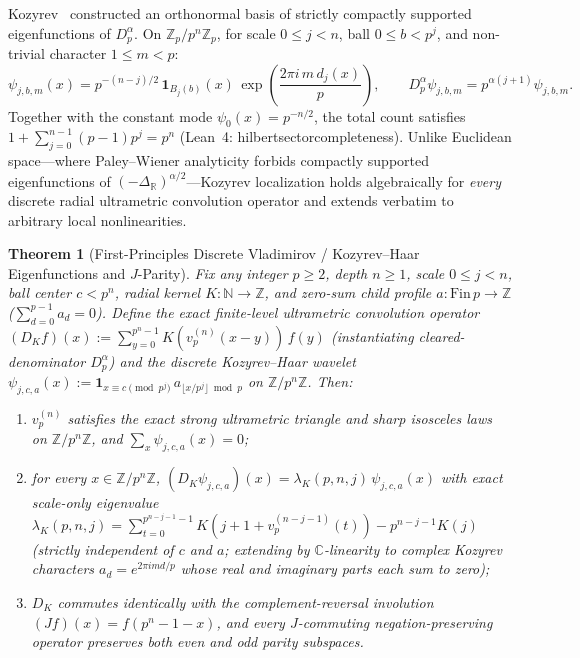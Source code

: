 \documentclass[11pt,a4paper]{article}
\numberwithin{equation}{section}
\theoremstyle{plain}
\newtheorem{theorem}{Theorem}[section]
\theoremstyle{definition}
\theoremstyle{remark}
\newcommand{\N}{\mathbb{N}}
\newcommand{\Z}{\mathbb{Z}}
\newcommand{\R}{\mathbb{R}}
\newcommand{\C}{\mathbb{C}}
\newcommand{\Zp}{\mathbb{Z}_p}
\newcommand{\Dp}{D_p^\alpha}
\newcommand{\code}[1]{{\ttfamily\footnotesize\def\_{\textunderscore\penalty0\hskip0pt}#1}}
\begin{document}
Kozyrev~\cite{Kozyrev2002} constructed an orthonormal basis of strictly compactly supported eigenfunctions of $\Dp$. On $\Zp / p^n\Zp$, for scale $0 \le j < n$, ball $0 \le b < p^j$, and non-trivial character $1 \le m < p$:
\begin{equation}
  \psi_{j,b,m}(x) = p^{-(n-j)/2} \, \mathbf{1}_{B_j(b)}(x) \, \exp\!\left(\frac{2\pi i \, m \, d_j(x)}{p}\right),
  \qquad \Dp \psi_{j,b,m} = p^{\alpha(j+1)} \psi_{j,b,m}.
  \label{eq:kozyrev}
\end{equation}
Together with the constant mode $\psi_0(x) = p^{-n/2}$, the total count satisfies $1 + \sum_{j=0}^{n-1}(p-1)p^j = p^n$ (Lean~4: \code{hilbert\_sector\_completeness}). Unlike Euclidean space---where Paley--Wiener analyticity forbids compactly supported eigenfunctions of $(-\Delta_{\R})^{\alpha/2}$---Kozyrev localization holds algebraically for \emph{every} discrete radial ultrametric convolution operator and extends verbatim to arbitrary local nonlinearities.

\begin{theorem}[First-Principles Discrete Vladimirov / Kozyrev--Haar Eigenfunctions and $J$-Parity]
\label{thm:vladimirov-kozyrev}
Fix any integer $p \ge 2$, depth $n \ge 1$, scale $0 \le j < n$, ball center $c < p^n$, radial kernel $K : \N \to \Z$, and zero-sum child profile $a : \mathrm{Fin}\,p \to \Z$ ($\sum_{d=0}^{p-1} a_d = 0$). Define the exact finite-level ultrametric convolution operator $(D_K f)(x) := \sum_{y=0}^{p^n - 1} K(v_p^{(n)}(x - y))\, f(y)$ (instantiating cleared-denominator $\Dp$) and the discrete Kozyrev--Haar wavelet $\psi_{j,c,a}(x) := \mathbf{1}_{x \equiv c \pmod{p^j}}\, a_{\lfloor x/p^j\rfloor \bmod p}$ on $\Z/p^n\Z$. Then:
\begin{enumerate}[leftmargin=1.8em,itemsep=1pt]
  \item $v_p^{(n)}$ satisfies the exact strong ultrametric triangle and sharp isosceles laws on $\Z/p^n\Z$, and $\sum_{x} \psi_{j,c,a}(x) = 0$;
  \item for every $x \in \Z/p^n\Z$, $(D_K \psi_{j,c,a})(x) = \lambda_K(p,n,j)\,\psi_{j,c,a}(x)$ with exact scale-only eigenvalue $\lambda_K(p,n,j) = \sum_{t=0}^{p^{n-j-1}-1} K(j + 1 + v_p^{(n-j-1)}(t)) - p^{n-j-1} K(j)$ (strictly independent of $c$ and $a$; extending by $\C$-linearity to complex Kozyrev characters $a_d = e^{2\pi i m d/p}$ whose real and imaginary parts each sum to zero);
  \item $D_K$ commutes identically with the complement-reversal involution $(J f)(x) = f(p^n - 1 - x)$, and every $J$-commuting negation-preserving operator preserves both even and odd parity subspaces.
\end{enumerate}
\end{theorem}
\end{document}
